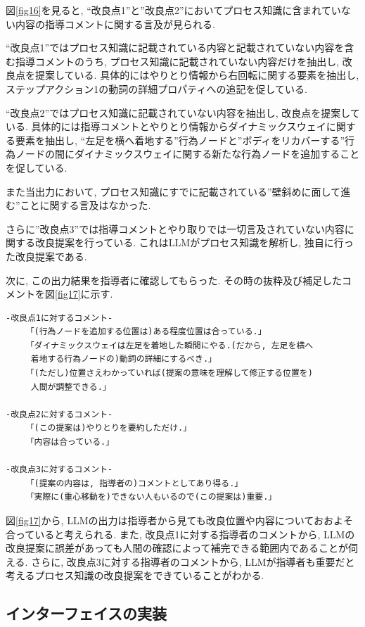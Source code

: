 \label{fig16}


図\ref{fig16}を見ると, “改良点1”と”改良点2”においてプロセス知識に含まれていない内容の指導コメントに関する言及が見られる. 

“改良点1”ではプロセス知識に記載されている内容と記載されていない内容を含む指導コメントのうち, プロセス知識に記載されていない内容だけを抽出し, 改良点を提案している. 具体的にはやりとり情報から右回転に関する要素を抽出し, ステップアクション1の動詞の詳細プロパティへの追記を促している. 

“改良点2”ではプロセス知識に記載されていない内容を抽出し, 改良点を提案している. 具体的には指導コメントとやりとり情報からダイナミックスウェイに関する要素を抽出し, “左足を横へ着地する”行為ノードと”ボディをリカバーする”行為ノードの間にダイナミックスウェイに関する新たな行為ノードを追加することを促している.

また当出力において, プロセス知識にすでに記載されている”壁斜めに面して進む”ことに関する言及はなかった. 

さらに”改良点3”では指導コメントとやり取りでは一切言及されていない内容に関する改良提案を行っている. これはLLMがプロセス知識を解析し, 独自に行った改良提案である.

次に, この出力結果を指導者に確認してもらった. その時の抜粋及び補足したコメントを図\ref{fig17}に示す.

\begin{tcolorbox}[breakable, colback=white, colframe=black]
    \begin{verbatim}
-改良点1に対するコメント-
    「(行為ノードを追加する位置は)ある程度位置は合っている.」
    「ダイナミックスウェイは左足を着地した瞬間にやる.(だから, 左足を横へ
     着地する行為ノードの)動詞の詳細にするべき.」
    「(ただし)位置さえわかっていれば(提案の意味を理解して修正する位置を)
     人間が調整できる.」

-改良点2に対するコメント-
    「(この提案は)やりとりを要約しただけ.」
    「内容は合っている.」

-改良点3に対するコメント-
    「(提案の内容は, 指導者の)コメントとしてあり得る.」
    「実際に(重心移動を)できない人もいるので(この提案は)重要.」
    \end{verbatim}
\end{tcolorbox}
    
\label{fig17}


図\ref{fig17}から, LLMの出力は指導者から見ても改良位置や内容についておおよそ合っていると考えられる. また, 改良点1に対する指導者のコメントから, LLMの改良提案に誤差があっても人間の確認によって補完できる範囲内であることが伺える. さらに, 改良点3に対する指導者のコメントから, LLMが指導者も重要だと考えるプロセス知識の改良提案をできていることがわかる. 

\subsection{インターフェイスの実装}




